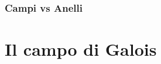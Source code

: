 
\textsf{\small }

\subsubsection{Campi vs Anelli} %

\textsf{\small }




\section{Il campo di Galois} %



